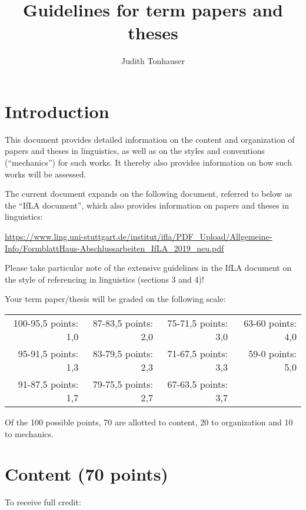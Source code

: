 \documentclass[11pt,fleqn,a4paper/thesis]{article}
\title{Guidelines for term papers and theses}
\author{Judith Tonhauser}
\affil{University of Stuttgart}
\newcommand{\6}{\mbox{$[\hspace*{-.6mm}[$}}
\newcommand{\9}{\mbox{$]\hspace*{-.6mm}]$}}
\begin{document}
\maketitle

\section{Introduction}

This document provides detailed information on the content and organization of papers and theses in linguistics, as well as on the styles and conventions (``mechanics'') for such works. It thereby also provides information on how such works will be assessed. 

The current document expands on the following document, referred to below as the ``IfLA document'', which also provides information on papers and theses in linguistics: 

\url{https://www.ling.uni-stuttgart.de/institut/ifla/PDF_Upload/Allgemeine-Info/FormblattHaus-Abschlussarbeiten_IfLA_2019_neu.pdf}

Please take particular note of the extensive guidelines in the IfLA document on the style of referencing in linguistics (sections 3 and 4)!

Your term paper/thesis will be graded on the following scale: 

\setlength{\tabcolsep}{20pt}
\begin{tabular}{rrrr}
100-95,5 points: 1,0 & 87-83,5 points: 2,0 & 75-71,5 points: 3,0 & 63-60 points: 4,0  \\ 
95-91,5 points: 1,3 & 83-79,5 points: 2,3  & 71-67,5 points: 3,3 & 59-0 points: 5,0 \\
91-87,5 points: 1,7 & 79-75,5 points: 2,7 & 67-63,5 points: 3,7 & \\
\end{tabular}

Of the 100 possible points, 70 are allotted to content, 20 to organization and 10 to mechanics.

\section{Content (70 points)}

To receive full credit:
\end{document}
